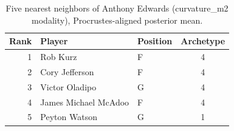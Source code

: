 \begin{table}[htbp]
  \centering\small
  \begin{tabular}{rllc}
    \toprule
    Rank & Player & Position & Archetype \\
    \midrule
    1 & Rob Kurz & F & 4 \\
    2 & Cory Jefferson & F & 4 \\
    3 & Victor Oladipo & G & 4 \\
    4 & James Michael McAdoo & F & 4 \\
    5 & Peyton Watson & G & 1 \\
    \bottomrule
  \end{tabular}
  \caption{Five nearest neighbors of Anthony Edwards (curvature_m2 modality), Procrustes-aligned posterior mean.}
  \label{tab:Anthony_Edwards_neighbors_curvature_m2}
\end{table}

